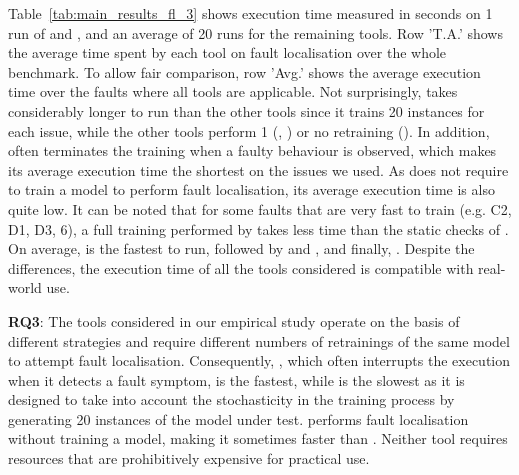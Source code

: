 Table~\ref{tab:main_results_fl_3} shows execution time measured in seconds on 1 run of \dfd and \NL, and an average of 20 runs for the remaining tools. Row 'T.A.' shows the average time spent by each tool on fault localisation over the whole benchmark. To allow fair comparison, row 'Avg.' shows the average execution time over the faults where all tools are applicable. Not surprisingly, \dfd takes considerably longer to run than the other tools since it trains 20 instances for each issue, while the other tools perform 1 (\DD, \UM) or no retraining (\NL). In addition, \DD often terminates the training when a faulty behaviour is observed, which makes its average execution time the shortest on the issues we used. As \NL does not require to train a model to perform fault localisation, its average execution time is also quite low. It can be noted that for some faults that are very fast to train (e.g. C2, D1, D3, 6), a full training performed by \UM takes less time than the static checks of \NL. On average, \DD is the fastest to run, followed by \NL and \UM, and finally, \dfd. Despite the differences, the execution time of all the tools considered is compatible with real-world use.

\begin{tcolorbox}[colback = box-white]
  \textbf{RQ3}: The tools considered in our empirical study operate on the basis of different strategies and require different numbers of retrainings of the same model to attempt fault localisation. Consequently, \DD, which often interrupts the execution when it detects a fault symptom, is the fastest, while \dfd is the slowest as it is designed to take into account the stochasticity in the training process by generating 20 instances of the model under test. \NL 
 performs fault localisation without training a model, making it sometimes faster than \UM. Neither tool requires resources that are prohibitively expensive for practical use.
\end{tcolorbox}



